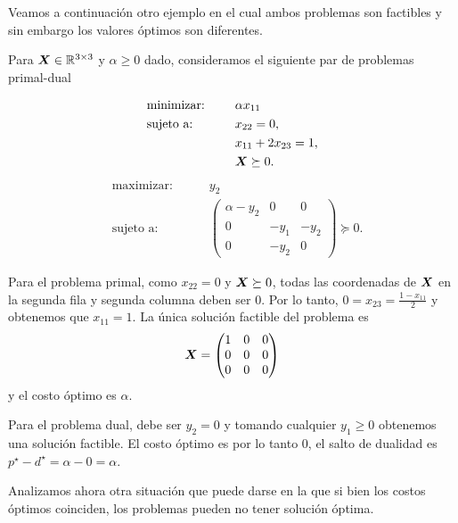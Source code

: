 Veamos a continuación otro ejemplo en el cual ambos problemas son factibles y sin embargo los valores óptimos son diferentes.

\begin{example}
Para $\bm{X} \in \mathbb{R}^{3 \times 3}$ y $\alpha \ge 0$ dado, consideramos el siguiente par de problemas primal-dual

\begin{multicols}{2}\noindent
\begin{alignat*}{2}
  & \text{minimizar: }  & \quad & \alpha x_{11}   \\
   & \text{sujeto a: } & \quad & x_{22} = 0, \\
   &&& x_{11} + 2 x_{23} = 1, \\
   &&& \Xb \succeq 0.
\end{alignat*}
\begin{alignat*}{2}
  & \text{maximizar: }  & \quad & y_2   \\
   & \text{sujeto a: } & \quad & \begin{pmatrix}
\alpha - y_2 & 0 & 0 \\ 0 & -y_1 & -y_2 \\ 0 & -y_2 & 0 \end{pmatrix} \succeq 0.
\end{alignat*}
\end{multicols}

Para el problema primal, como $x_{22}=0$ y $\bm{X} \succeq 0$, todas las coordenadas de $\bm{X}$ en la segunda fila y segunda columna deben ser 0. Por lo tanto, $0 = x_{23} = \frac{1 - x_{11}}{2}$ y obtenemos que $x_{11} = 1$. La única solución factible del problema es 
$$
\bm{X} = \begin{pmatrix}
1 & 0 & 0 \\ 0 & 0 & 0 \\ 0 & 0 & 0 \end{pmatrix}$$
y el costo óptimo es $\alpha$.

Para el problema dual, debe ser $y_2 = 0$ y tomando cualquier $y_1 \ge 0$ obtenemos una solución factible. El costo óptimo es por lo tanto 0, el salto de dualidad es $p^\star - d^\star = \alpha - 0 = \alpha$.

\end{example}

Analizamos ahora otra situación que puede darse en la que si bien los costos óptimos coinciden, los problemas pueden no tener solución óptima.

